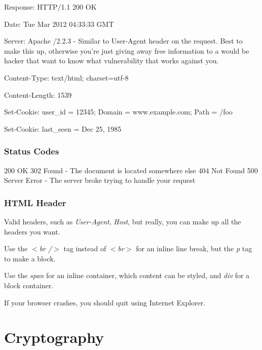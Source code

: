 \documentclass[12pt]{article}
\begin{document}
\begin{list}{*}{
\setlength{\itemsep}{0pt}
\setlength{\parsep}{0pt}
\setlength{\topsep}{0pt}
\setlength{\partopsep}{0pt}
\setlength{\leftmargin}{2em}
\setlength{\labelwidth}{1.5em}
\setlength{\labelsep}{0.5em}
}
\item Response: HTTP/1.1 200 OK
\item Date: Tue Mar 2012 04:33:33 GMT
\item Server: Apache /2.2.3 - Similar to User-Agent header on the request. Best to make this up, otherwise you're just giving away free information to a would be hacker that want to know what vulnerability that works against you.
\item Content-Type: text/html; charset=utf-8
\item Content-Length: 1539
\item Set-Cookie: user\_id = 12345; Domain = www.example.com; Path = /foo
\item Set-Cookie: last\_seen = Dec 25, 1985
\end{list}

\subsubsection*{Status Codes}
200 OK
302 Found - The document is located somewhere else
404 Not Found
500 Server Error - The server broke trying to handle your request

\subsubsection*{HTML Header}
Valid headers, such as \emph{User-Agent}, \emph{Host}, but really, you can make up all the headers you want.

Use the \emph{$<$br /$>$} tag instead of \emph{$<$br$>$} for an inline line break, but the \emph{p} tag to make a block.

Use the \emph{span} for an inline container, which content can be styled, and \emph{div} for a block container.

If your browser crashes, you should quit using Internet Explorer.

\section*{Cryptography}
\end{document}
